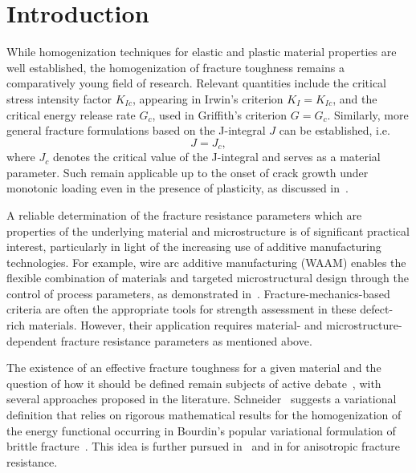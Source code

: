 \documentclass[pdflatex,sn-mathphys-num]{sn-jnl}%
\theoremstyle{thmstyleone}%
\theoremstyle{thmstyletwo}%
\theoremstyle{thmstylethree}%
\begin{document}
\section{Introduction}\label{sec:intro}


While homogenization techniques for elastic and plastic material properties are well established,
the homogenization of fracture toughness remains a comparatively young field of research.
Relevant quantities include the critical stress intensity factor \( K_{Ic} \),
appearing in Irwin’s criterion \( K_I = K_{Ic} \), and the critical energy release rate \( G_c \),
used in Griffith’s criterion \( G = G_c \).
Similarly,  more general fracture formulations based on the J-integral $J$ can be established, i.e.
\begin{equation}
    J = J_c,
    \label{eq:fracture_criterion_J}
\end{equation}
where \( J_c \) denotes the critical value of the J-integral and serves as a material parameter.
Such 
remain applicable up to the onset of crack growth under monotonic loading even
in the presence of plasticity, as discussed in~\cite{gross_fracture_2011}.



A reliable determination of the fracture resistance parameters which are properties of the 
underlying material and microstructure is of significant
practical interest, particularly in light of the increasing use of
additive manufacturing technologies. For example, wire arc additive manufacturing (WAAM) enables the flexible combination of materials
and targeted microstructural design through the control of process parameters,
as demonstrated in~\cite{hauser_porosity_2021}. Fracture-mechanics-based criteria are often the appropriate tools
for strength assessment in these defect-rich materials.
However, their application requires material- and microstructure-dependent
fracture resistance parameters as mentioned above.

The existence of an effective fracture toughness for a given material
and the question of how it should be defined remain subjects
of active debate~\cite{lebihain_brittle_2021},
with several approaches proposed in the literature.
Schneider~\cite{schneider_fftbased_2020} suggests a variational definition that
relies on rigorous mathematical results for the homogenization of
the energy functional occurring in Bourdin's popular variational formulation of brittle fracture~\cite{bourdin_variational_2008}.
This idea is further pursued in~\cite{ernesti_fast_2021} and in
\cite{ernesti_computing_2022} for anisotropic fracture resistance.
\end{document}
